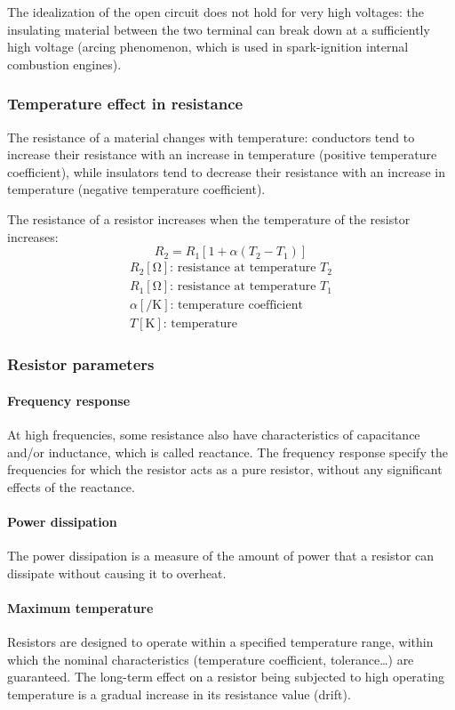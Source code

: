 \documentclass[10pt, twocolumn]{article}
\begin{document}
The idealization of the open circuit does not hold for very high voltages: the insulating material between the two terminal can break down at a sufficiently high voltage (arcing phenomenon, which is used in spark-ignition internal combustion engines).


\subsubsection{Temperature effect in resistance}
The resistance of a material changes with temperature: conductors tend to increase their resistance with an increase in temperature (positive temperature coefficient), while insulators tend to decrease their resistance with an increase in temperature (negative temperature coefficient).

The resistance of a resistor increases when the temperature of the resistor increases:
\[
  R_2 = R_1 [1 + \alpha (T_2 - T_1)]
\]
\[
  \begin{array}{|l}
    R_2 [\si{\ohm}] \text{: resistance at temperature } T_2    \\
    R_1 [\si{\ohm}] \text{: resistance at temperature } T_1    \\
    \alpha [\si{\per\kelvin}] \text{: temperature coefficient} \\
    T [\si{\kelvin}] \text{: temperature}
  \end{array}
\]


\subsubsection{Resistor parameters}
\paragraph{Frequency response}
At high frequencies, some resistance also have characteristics of capacitance and/or inductance, which is called reactance.
The frequency response specify the frequencies for which the resistor acts as a pure resistor, without any significant effects of the reactance.


\paragraph{Power dissipation}
The power dissipation is a measure of the amount of power that a resistor can dissipate without causing it to overheat.


\paragraph{Maximum temperature}
Resistors are designed to operate within a specified temperature range, within which the nominal characteristics (temperature coefficient, tolerance\dots{}) are guaranteed.
The long-term effect on a resistor being subjected to high operating temperature is a gradual increase in its resistance value (drift).
\end{document}
